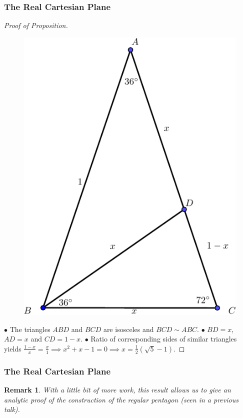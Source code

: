 \documentclass[compress,mathserif,serif]{beamer}
\newtheorem{rem}{Remark}
\begin{document}
\begin{frame}
\frametitle{The Real Cartesian Plane}
\begin{proof}[Proof of Proposition] 

\begin{figure}[hbtp]
\centering
\includegraphics[scale=.4]{construction.pdf}
\end{figure}
$\bullet$ The triangles $ABD$ and $BCD$ are isosceles and $BCD \sim ABC$.
\pause
\newline
$\bullet$ $BD=x$, $AD=x$ and $CD=1-x$. 
\pause
\newline
$\bullet$ Ratio of corresponding sides of similar triangles yields $\frac{1-x}{x}= \frac{x}{1} \implies x^2+x-1=0 \implies x= \frac{1}{2}( \sqrt{5}-1).$

\end{proof}
\end{frame}

\begin{frame}
\frametitle{The Real Cartesian Plane}
\begin{rem} With a little bit of more work, this result allows us to give an analytic proof of the construction of the regular pentagon (seen in a previous talk). 
\end{rem}
\end{frame}
\end{document}
